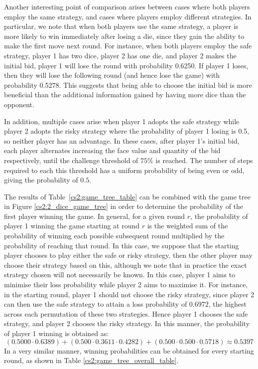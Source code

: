 Another interesting point of comparison arises between cases where both players employ the same strategy, and cases where players employ different strategies. In particular, we note that when both players use the same strategy, a player is more likely to win immediately after losing a die, since they gain the ability to make the first move next round. For instance, when both players employ the safe strategy, player 1 has two dice, player 2 has one die, and player 2 makes the initial bid, player 1 will lose the round with probability 0.6250. If player 1 loses, then they will lose the following round (and hence lose the game) with probability 0.5278. This suggests that being able to choose the initial bid is more beneficial than the additional information gained by having more dice than the opponent.

In addition, multiple cases arise when player 1 adopts the safe strategy while player 2 adopts the risky strategy where the probability of player 1 losing is 0.5, so neither player has an advantage. In these cases, after player 1's initial bid, each player alternates increasing the face value and quantity of the bid respectively, until the challenge threshold of $75\%$ is reached. The number of steps required to each this threshold has a uniform probability of being even or odd, giving the probability of $0.5$.

The results of Table~\ref{cs2:game_tree_table} can be combined with the game tree in Figure \ref{cs2:2_dice_game_tree} in order to determine the probability of the first player winning the game. In general, for a given round $r$, the probability of player 1 winning the game starting at round $r$ is the weighted sum of the probability of winning each possible subsequent round multiplied by the probability of reaching that round. In this case, we suppose that the starting player chooses to play either the safe or risky strategy, then the other player may choose their strategy based on this, although we note that in practice the exact strategy chosen will not necessarily be known. In this case, player 1 aims to minimise their loss probability while player 2 aims to maximise it. For instance, in the starting round, player 1 should not choose the risky strategy, since player 2 can then use the safe strategy to attain a loss probability of 0.6972, the highest across each permutation of these two strategies. Hence player 1 chooses the safe strategy, and player 2 chooses the risky strategy. In this manner, the probability of player 1 winning is obtained as:
\begin{equation*}
    \left( 0.5000 \cdot 0.6389 \right) + \left(0.500 \cdot 0.3611 \cdot 0.4282 \right) + \left( 0.500 \cdot 0.500 \cdot 0.5718 \right) \approx 0.5397
\end{equation*}
In a very similar manner, winning probabilities can be obtained for every starting round, as shown in Table \ref{cs2:game_tree_overall_table}.

